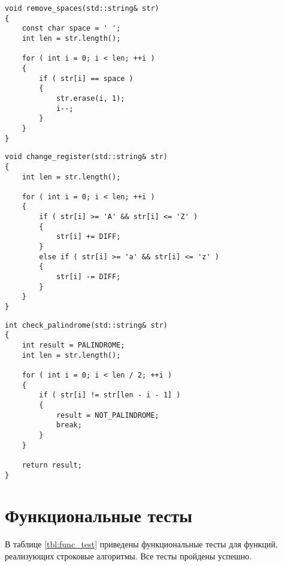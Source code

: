 \begin{center}
    \captionsetup{justification=raggedright,singlelinecheck=off}
    \begin{lstlisting}[label=lst:spaces,caption=Алгоритм удаления пробелов]
void remove_spaces(std::string& str)
{
    const char space = ' ';
    int len = str.length();

    for ( int i = 0; i < len; ++i )
    {
        if ( str[i] == space )
        {
            str.erase(i, 1);
            i--;
        }
    }
}
\end{lstlisting}
\end{center}

\begin{center}
    \captionsetup{justification=raggedright,singlelinecheck=off}
    \begin{lstlisting}[label=lst:register,caption=Алгоритм перевода в другой регистр]
void change_register(std::string& str)
{
    int len = str.length();

    for ( int i = 0; i < len; ++i )
    {
        if ( str[i] >= 'A' && str[i] <= 'Z' )
        {
            str[i] += DIFF;
        }
        else if ( str[i] >= 'a' && str[i] <= 'z' )
        {
            str[i] -= DIFF;
        }
    }
}
\end{lstlisting}
\end{center}

\begin{center}
    \captionsetup{justification=raggedright,singlelinecheck=off}
    \begin{lstlisting}[label=lst:palindrome,caption=Алгоритм определения палиндрома]
int check_palindrome(std::string& str)
{
    int result = PALINDROME;
    int len = str.length();

    for ( int i = 0; i < len / 2; ++i )
    {
        if ( str[i] != str[len - i - 1] )
        {
            result = NOT_PALINDROME;
            break;
        }
    }

    return result;
}
\end{lstlisting}
\end{center}

\section{Функциональные тесты}

В таблице \ref{tbl:func_test} приведены функциональные тесты для функций, реализующих строковые алгоритмы. Все тесты пройдены успешно.

